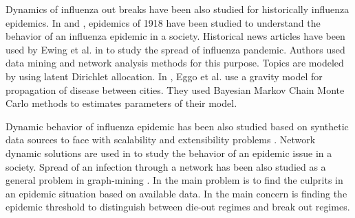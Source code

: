 Dynamics of influenza out breaks have been also studied for historically influenza epidemics. In \cite{ref8} and \cite{ref12}, epidemics of 1918 have been studied to understand the behavior of an influenza epidemic in a society. Historical news articles have been used by Ewing et al. in \cite{ref8} to study the spread of influenza pandemic. Authors used data mining and network analysis methods for this purpose. Topics are modeled by using latent Dirichlet allocation. In \cite{ref12}, Eggo et al. use a gravity model for propagation of disease between cities. They used Bayesian Markov Chain Monte Carlo methods to estimates parameters of their model. 

Dynamic behavior of influenza epidemic has been also studied based on synthetic data sources to face with scalability and extensibility problems \cite{ref11}. Network dynamic solutions are used in \cite{ref11} to study the behavior of an epidemic issue in a society. Spread of an infection through a network has been also studied as a general problem in graph-mining \cite{ref13} \cite{ref14}. In \cite{ref14} the main problem is to find the culprits in an epidemic situation based on available data. In \cite{ref13} the main concern is finding the epidemic threshold to distinguish between die-out regimes and break out regimes. 

